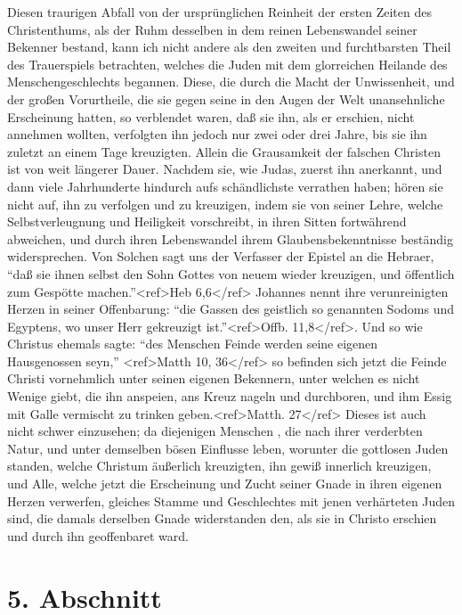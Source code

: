 Diesen traurigen Abfall von der ursprünglichen Reinheit der ersten Zeiten des Christenthums, als der Ruhm desselben in dem reinen Lebenswandel seiner Bekenner bestand, kann ich nicht andere als den zweiten und furchtbarsten Theil des Trauerspiels betrachten, welches die Juden mit dem glorreichen Heilande des Menschengeschlechts begannen. Diese, die durch die Macht der Unwissenheit, und der großen Vorurtheile, die sie gegen seine in den Augen der Welt unansehnliche Erscheinung hatten, so verblendet waren, daß sie ihn, als er erschien, nicht annehmen wollten, verfolgten ihn jedoch nur zwei oder drei Jahre, bis sie ihn zuletzt an einem Tage kreuzigten. Allein die Grausamkeit der falschen Christen ist von weit längerer Dauer. Nachdem sie, wie Judas, zuerst ihn anerkannt, und dann viele Jahrhunderte hindurch aufs schändlichste verrathen haben; hören sie nicht auf, ihn zu verfolgen und zu kreuzigen, indem sie von seiner Lehre, welche Selbstverleugnung und Heiligkeit vorschreibt, in ihren Sitten fortwährend abweichen, und durch ihren Lebenswandel ihrem Glaubensbekenntnisse beständig widersprechen. Von Solchen sagt uns der Verfasser der Epistel an die Hebraer, ``daß sie ihnen selbst den Sohn Gottes von neuem wieder kreuzigen, und öffentlich zum Gespötte machen.''<ref>Heb 6,6</ref> Johannes nennt ihre verunreinigten Herzen in seiner Offenbarung: ``die Gassen des geistlich so genannten Sodoms und Egyptens, wo unser Herr gekreuzigt ist.''<ref>Offb. 11,8</ref>. Und so wie Christus ehemals sagte: ``des Menschen Feinde werden seine eigenen Hausgenossen seyn,'' <ref>Matth 10, 36</ref> so befinden sich jetzt die Feinde Christi vornehmlich unter seinen eigenen Bekennern, unter welchen es nicht Wenige giebt, die ihn anspeien, ans Kreuz nageln und durchboren, und ihm Essig mit Galle vermischt zu trinken geben.<ref>Matth. 27</ref> Dieses ist auch nicht schwer einzusehen; da diejenigen Menschen , die nach ihrer verderbten Natur, und unter demselben bösen Einflusse leben, worunter die gottlosen Juden standen, welche Christum äußerlich kreuzigten, ihn gewiß innerlich kreuzigen, und Alle, welche jetzt die Erscheinung und Zucht seiner Gnade in ihren eigenen Herzen verwerfen, gleiches Stamme und Geschlechtes mit jenen verhärteten Juden sind, die damals derselben Gnade widerstanden den, als sie in Christo erschien und durch ihn geoffenbaret ward. 

\section{5. Abschnitt}

